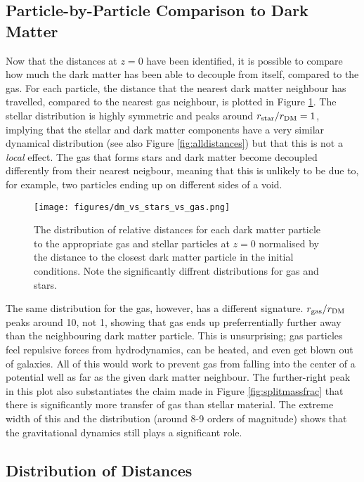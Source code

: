 \subsection{Particle-by-Particle Comparison to Dark Matter}

Now that the distances at $z=0$ have been identified, it is possible to compare
how much the dark matter has been able to decouple from itself, compared to the
gas. For each particle, the distance that the nearest dark matter neighbour has
travelled, compared to the nearest gas neighbour, is plotted in Figure
\ref{fig:dmvsstarvsgas}. The stellar distribution is highly symmetric and peaks
around $r_{\rm star}/r_{\rm DM} = 1$, implying that the stellar and dark matter
components have a very similar dynamical distribution (see also Figure
\ref{fig:alldistances}) but that this is not a \emph{local} effect. The gas
that forms stars and dark matter become decoupled differently from their
nearest neigbour, meaning that this is unlikely to be due to, for example, two
particles ending up on different sides of a void.

\begin{figure} \centering
	\texttt{[image: figures/dm\_vs\_stars\_vs\_gas.png]}
	\caption{The distribution of relative distances for each dark matter
	particle to the appropriate gas and stellar particles at $z=0$
	normalised by the distance to the closest dark matter particle in the
	initial conditions. Note the significantly diffrent distributions for
	gas and stars.} \label{fig:dmvsstarvsgas} \end{figure}

The same distribution for the gas, however, has a different signature. $r_{\rm
gas}/r_{\rm DM}$ peaks around 10, not 1, showing that gas ends up
preferrentially further away than the neighbouring dark matter particle. This
is unsurprising; gas particles feel repulsive forces from hydrodynamics, can be
heated, and even get blown out of galaxies. All of this would work to prevent
gas from falling into the center of a potential well as far as the given dark
matter neighbour. The further-right peak in this plot also substantiates the
claim made in Figure \ref{fig:splitmassfrac} that there is significantly more
transfer of gas than stellar material. The extreme width of this and the
distribution (around 8-9 orders of magnitude) shows that the gravitational
dynamics still plays a significant role.

\subsection{Distribution of Distances}

